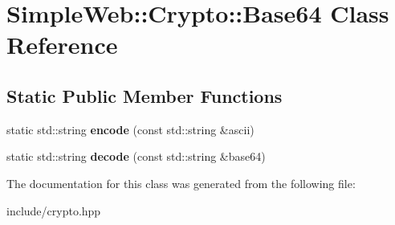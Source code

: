 \hypertarget{classSimpleWeb_1_1Crypto_1_1Base64}{}\section{Simple\+Web\+:\+:Crypto\+:\+:Base64 Class Reference}
\label{classSimpleWeb_1_1Crypto_1_1Base64}
\subsection*{Static Public Member Functions}
\begin{DoxyCompactItemize}
\item 
static std\+::string {\bfseries encode} (const std\+::string \&ascii)\hypertarget{classSimpleWeb_1_1Crypto_1_1Base64_a299572ed812c789fa0a681bd94e282d0}{}\label{classSimpleWeb_1_1Crypto_1_1Base64_a299572ed812c789fa0a681bd94e282d0}

\item 
static std\+::string {\bfseries decode} (const std\+::string \&base64)\hypertarget{classSimpleWeb_1_1Crypto_1_1Base64_ace7c4c2244925b5068e645cc1d791104}{}\label{classSimpleWeb_1_1Crypto_1_1Base64_ace7c4c2244925b5068e645cc1d791104}

\end{DoxyCompactItemize}


The documentation for this class was generated from the following file\+:\begin{DoxyCompactItemize}
\item 
include/crypto.\+hpp\end{DoxyCompactItemize}
